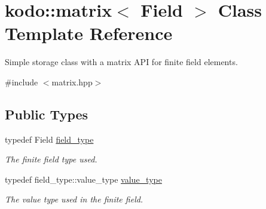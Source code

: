 \hypertarget{classkodo_1_1matrix}{\section{kodo\-:\-:matrix$<$ Field $>$ Class Template Reference}
\label{classkodo_1_1matrix}
}


Simple storage class with a matrix A\-P\-I for finite field elements.  




{\ttfamily \#include $<$matrix.\-hpp$>$}

\subsection*{Public Types}
\begin{DoxyCompactItemize}
\item 
\hypertarget{classkodo_1_1matrix_ae5138a3af8e21df97ae7ced17f1b812d}{typedef Field \hyperlink{classkodo_1_1matrix_ae5138a3af8e21df97ae7ced17f1b812d}{field\-\_\-type}}\label{classkodo_1_1matrix_ae5138a3af8e21df97ae7ced17f1b812d}

\begin{DoxyCompactList}\small\item\em The finite field type used. \end{DoxyCompactList}\item 
\hypertarget{classkodo_1_1matrix_afc02736846855895f1d19bf2d1e96978}{typedef field\-\_\-type\-::value\-\_\-type \hyperlink{classkodo_1_1matrix_afc02736846855895f1d19bf2d1e96978}{value\-\_\-type}}\label{classkodo_1_1matrix_afc02736846855895f1d19bf2d1e96978}

\begin{DoxyCompactList}\small\item\em The value type used in the finite field. \end{DoxyCompactList}\end{DoxyCompactItemize}
